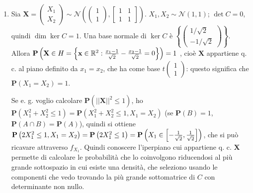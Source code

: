 \documentclass{article}
\begin{document}
\begin{enumerate}
\item Sia $\mathbf{X=}\left( 
\begin{array}{c}
X_{1} \\ 
X_{2}%
\end{array}%
\right) \sim \mathcal{N}\left( \left( 
\begin{array}{c}
1 \\ 
1%
\end{array}%
\right) ,\left[ 
\begin{array}{cc}
1 & 1 \\ 
1 & 1%
\end{array}%
\right] \right) $. $X_{1},X_{2}\sim \mathcal{N}\left( 1,1\right) $; $\det
C=0 $, quindi $\dim \ker C=1$. Una base normale di $\ker C$ \`{e} $\left\{
\left( 
\begin{array}{c}
1/\sqrt{2} \\ 
-1/\sqrt{2}%
\end{array}%
\right) \right\} $. Allora $\mathbf{P}\left( \mathbf{X}\in H=\left\{ \mathbf{%
x}\in 
\mathbb{R}
^{2}:\frac{x_{1}-1}{\sqrt{2}}-\frac{x_{2}-1}{\sqrt{2}}=0\right\} \right) =1$%
, cio\`{e} $\mathbf{X}$ appartiene q. c. al piano definito da $x_{1}=x_{2}$,
che ha come base $t\left( 
\begin{array}{c}
1 \\ 
1%
\end{array}%
\right) $: questo significa che $\mathbf{P}\left( X_{1}=X_{2}\right) =1$.

Se e. g. voglio calcolare $\mathbf{P}\left( \left\vert \left\vert \mathbf{X}%
\right\vert \right\vert ^{2}\leq 1\right) $, ho $\mathbf{P}\left(
X_{1}^{2}+X_{2}^{2}\leq 1\right) =\mathbf{P}\left( X_{1}^{2}+X_{2}^{2}\leq
1,X_{1}=X_{2}\right) $ (se $\mathbf{P}\left( B\right) =1$, $\mathbf{P}\left(
A\cap B\right) =\mathbf{P}\left( A\right) $), quindi si ottiene $\mathbf{P}%
\left( 2X_{1}^{2}\leq 1,X_{1}=X_{2}\right) =\mathbf{P}\left( 2X_{1}^{2}\leq
1\right) =\mathbf{P}\left( X_{1}\in \left[ -\frac{1}{\sqrt{2}},\frac{1}{%
\sqrt{2}}\right] \right) $, che si pu\`{o} ricavare attraverso $f_{X_{1}}$.
Quindi conoscere l'iperpiano cui appartiene q. c. $\mathbf{X}$ permette di
calcolare le probabilit\`{a} che lo coinvolgono riducendosi al pi\`{u}
grande sottospazio in cui esiste una densit\`{a}, che seleziono usando le
componenti che vedo trovando la pi\`{u} grande sottomatrice di $C$ con
determinante non nullo.
\end{enumerate}
\end{document}
